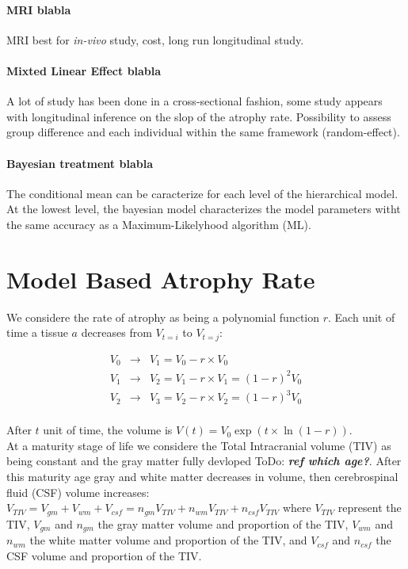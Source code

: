 \documentclass[final, paper=letter,5p,times,twocolumn]{elsarticle}
\newcommand{\ToDo}[1]{ToDo: \textbf{\textit{#1}}}
\theoremstyle{definition}
\begin{document}
\paragraph{MRI blabla}{MRI best for {\it in-vivo} study, cost, long run longitudinal study.}

\paragraph{Mixted Linear Effect blabla}{A lot of study has been done in a cross-sectional fashion, some study appears with longitudinal inference on the slop of the atrophy rate. Possibility to assess group difference and each individual within the same framework (random-effect).}

\paragraph{Bayesian treatment blabla}{The conditional mean can be caracterize for each level of the hierarchical model. At the lowest level, the bayesian model characterizes the model parameters witht the same accuracy as a Maximum-Likelyhood algorithm (ML).}

\section{Model Based Atrophy Rate}

We considere the rate of atrophy as being a polynomial function $r$. Each unit of time a tissue $a$ decreases from $V_{t=i}$ to $V_{t=j}$:

\begin{equation*}
  \left .
  \begin{array}{rcl}
    V_{0} & \rightarrow & V_{1} = V_{0} - r \times V_{0} \\
    V_{1} & \rightarrow & V_{2} = V_{1} - r \times V_{1} = (1-r)^{2}V_{0} \\
    V_{2} & \rightarrow & V_{3} = V_{2} - r \times V_{2} = (1-r)^{3}V_{0} \\
  \end{array}
  \right .
\end{equation*}

After $t$ unit of time, the volume is $V(t) = V_{0}\exp(t \times \ln(1-r))$.\\


At a maturity stage of life we considere the Total Intracranial volume (TIV) as being constant and the gray matter fully devloped \ToDo{ref which age?}. After this maturity age gray and white matter decreases in volume, then cerebrospinal fluid (CSF) volume increases: $V_{TIV} = V_{gm} + V_{wm} + V_{csf} = n_{gm}V_{TIV} + n_{wm}V_{TIV} + n_{csf}V_{TIV}$ where $V_{TIV}$ represent the TIV, $V_{gm}$ and $n_{gm}$ the gray matter volume and proportion of the TIV, $V_{wm}$ and $n_{wm}$ the white matter volume and proportion of the TIV, and $V_{csf}$ and $n_{csf}$ the CSF volume and proportion of the TIV. 
\end{document}
